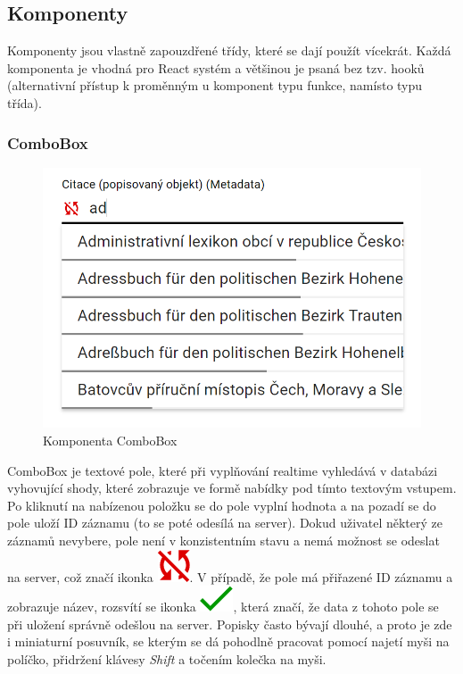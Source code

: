 \pagebreak
\subsection{Komponenty}
Komponenty jsou vlastně zapouzdřené třídy, které se dají použít vícekrát.
Každá komponenta je vhodná pro React systém a většinou je psaná bez tzv. hooků
(alternativní přístup k proměnným u komponent typu funkce, namísto typu třída).

\subsubsection{ComboBox}
\begin{figure}
	\centering
	\includegraphics[width=\linewidth]{img/ComboBox.png}
	\caption{Komponenta ComboBox}
\end{figure}
ComboBox je textové pole, které při vyplňování realtime vyhledává v databázi vyhovující shody,
které zobrazuje ve formě nabídky pod tímto textovým vstupem. Po kliknutí na nabízenou položku se
do pole vyplní hodnota a na pozadí se do pole uloží ID záznamu (to se poté odesílá na server).
Dokud uživatel některý ze záznamů nevybere, pole není v konzistentním stavu a nemá možnost se
odeslat na server, což značí ikonka
\includegraphics[height=\fontcharht\font`\B]{img/notSynced.png}.
V případě, že pole má přiřazené ID záznamu a zobrazuje název, rozsvítí se ikonka
\includegraphics[height=\fontcharht\font`\B]{img/synced.png},
která značí, že data z tohoto pole se při uložení správně odešlou na server.
Popisky často bývají dlouhé, a proto je zde i miniaturní posuvník, se kterým se
dá pohodlně pracovat pomocí najetí myši na políčko, přidržení klávesy \textit{Shift} a
točením kolečka na myši.

